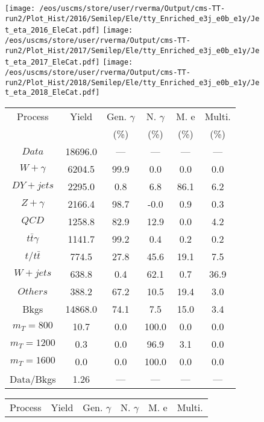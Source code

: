 \begin{figure}
\centering
\texttt{[image: /eos/uscms/store/user/rverma/Output/cms-TT-run2/Plot\_Hist/2016/Semilep/Ele/tty\_Enriched\_e3j\_e0b\_e1y/Jet\_eta\_2016\_EleCat.pdf]}
\texttt{[image: /eos/uscms/store/user/rverma/Output/cms-TT-run2/Plot\_Hist/2017/Semilep/Ele/tty\_Enriched\_e3j\_e0b\_e1y/Jet\_eta\_2017\_EleCat.pdf]}
\texttt{[image: /eos/uscms/store/user/rverma/Output/cms-TT-run2/Plot\_Hist/2018/Semilep/Ele/tty\_Enriched\_e3j\_e0b\_e1y/Jet\_eta\_2018\_EleCat.pdf]}
\begin{minipage}[c]{0.32\textwidth}
\centering
\tiny{
\begin{tabular}{cccccc}
\hline
Process & Yield & Gen. $\gamma$ & N. $\gamma$ & M. e & Multi. \\
 &  & (\%) & (\%) & (\%) & (\%)  \\
\hline
                                                                      $ Data $ &  18696.0 &  --- &  --- &  --- &  ---\\
$ W+\gamma $ &  6204.5 &  99.9 &  0.0 &  0.0 &  0.0\\
$ DY+jets $ &  2295.0 &  0.8 &  6.8 &  86.1 &  6.2\\
$ Z+\gamma $ &  2166.4 &  98.7 &  -0.0 &  0.9 &  0.3\\
$ QCD $ &  1258.8 &  82.9 &  12.9 &  0.0 &  4.2\\
$ t\bar{t}\gamma $ &  1141.7 &  99.2 &  0.4 &  0.2 &  0.2\\
$ t/t\bar{t} $ &  774.5 &  27.8 &  45.6 &  19.1 &  7.5\\
$ W+jets $ &  638.8 &  0.4 &  62.1 &  0.7 &  36.9\\
$ Others $ &  388.2 &  67.2 &  10.5 &  19.4 &  3.0\\
Bkgs &  14868.0 &  74.1 &  7.5 &  15.0 &  3.4\\
$ m_{T} = 800 $ &  10.7 &  0.0 &  100.0 &  0.0 &  0.0\\
$ m_{T} = 1200 $ &  0.3 &  0.0 &  96.9 &  3.1 &  0.0\\
$ m_{T} = 1600 $ &  0.0 &  0.0 &  100.0 &  0.0 &  0.0\\
Data/Bkgs &  1.26 &  --- &  --- &  --- &  ---\\
\hline
\end{tabular}
}
\end{minipage}
\begin{minipage}[c]{0.32\textwidth}
\centering
\tiny{
\begin{tabular}{cccccc}
\hline
Process & Yield & Gen. $\gamma$ & N. $\gamma$ & M. e & Multi. \\

\end{tabular}}
\end{minipage}
\end{figure}
